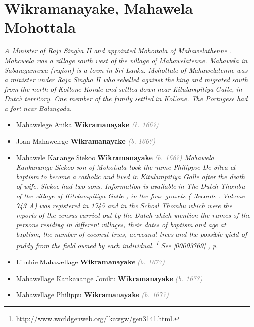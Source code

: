 \documentclass[10pt, openany]{book}
\begin{document}
\chapter{Wikramanayake, Mahawela Mohottala}
\label{00003764}
\textcolor{slmaroon}{\textit{A Minister of Raja Singha II and appointed Mohottala of Mahawelathenne . Mahawela was a village south west of the village of Mahawelatenne. Mahawela in Sabaragamuwa (region) is a town in Sri Lanka.
Mohottala of Mahawelatenne was a minister under Raja Singha II who rebelled against the king and migrated south from the north of Kollone Korale and settled down near Kitulampitiya Galle, in Dutch territory. One member of the family settled in Kollone. The Portugese had a fort near Balangoda.}}
\begin{itemize}
\item{Mahawelege Anika \textbf{Wikramanayake} \textcolor{gray}{\textit{(b. 166?)}}
  }
\item{Joan Mahawelege \textbf{Wikramanayake} \textcolor{gray}{\textit{(b. 166?)}}
  }
\item{Mahawele Kanange Siekoo \textbf{Wikramanayake} \textcolor{gray}{\textit{(b. 166?)}} \textcolor{slmaroon}{\textit{Mahawela Kankanange Siekoo son of Mohottala took the name Philippoe De Silva at baptism to become a catholic and lived in Kitulampitiya Galle after the death of wife. Siekoo had two sons.
Information is available in The Dutch Thombu of the village of Kitulampitiya Galle , in the four gravets ( Records : Volume 743 A) was registered in 1745 and in the School Thombu which were the reports of the census carried out by the Dutch which mention the names of the persons residing in different villages, their dates of baptism and age at baptism, the number of coconut trees, aerecanut trees and the possible yield of paddy from the field owned by each individual.
\footnote{\url{http://www.worldgenweb.org/lkawgw/gen3141.html.}}}} \textcolor{slteal}{\textit{See  \autoref{00003769} \textit{, p. \pageref{00003769} }}}}
\item{Linchie Mahawellage \textbf{Wikramanayake} \textcolor{gray}{\textit{(b. 167?)}}
  }
\item{Mahawellage Kankanange Joniku \textbf{Wikramanayake} \textcolor{gray}{\textit{(b. 167?)}}
   }
\item{Mahawellage Philippu \textbf{Wikramanayake} \textcolor{gray}{\textit{(b. 167?)}}
}
\end{itemize}
\end{document}

